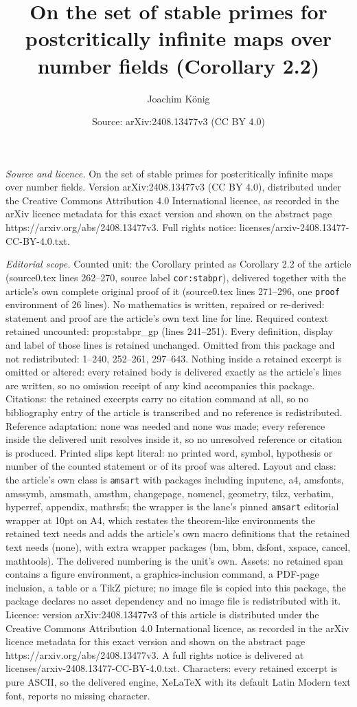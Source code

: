 \documentclass[10pt,a4paper]{amsart}
\title[On the set of stable primes for postcritically infinite maps]{On the set of stable primes for postcritically infinite maps over number fields (Corollary 2.2)}
\author{Joachim K\"onig}
\date{Source: arXiv:2408.13477v3 (CC BY 4.0)}
\begin{document}
\maketitle

\noindent\emph{Source and licence.} On the set of stable primes for postcritically infinite maps over number fields. Version arXiv:2408.13477v3 (CC BY 4.0), distributed under the Creative Commons Attribution 4.0 International licence, as recorded in the arXiv licence metadata for this exact version and shown on the abstract page https://arxiv.org/abs/2408.13477v3. Full rights notice: licenses/arxiv-2408.13477-CC-BY-4.0.txt.\par\smallskip

\noindent\textit{Editorial scope.} Counted unit: the Corollary printed as Corollary 2.2 of the article (source0.tex lines 262--270, source label \texttt{cor:stabpr}), delivered together with the article's own complete original proof of it (source0.tex lines 271--296, one \texttt{proof} environment of 26 lines). No mathematics is written, repaired or re-derived: statement and proof are the article's own text line for line. Required context retained uncounted: prop:stabpr\_gp (lines 241--251). Every definition, display and label of those lines is retained unchanged. Omitted from this package and not redistributed: 1--240, 252--261, 297--643. Nothing inside a retained excerpt is omitted or altered: every retained body is delivered exactly as the article's lines are written, so no omission receipt of any kind accompanies this package. Citations: the retained excerpts carry no citation command at all, so no bibliography entry of the article is transcribed and no reference is redistributed. Reference adaptation: none was needed and none was made; every reference inside the delivered unit resolves inside it, so no unresolved reference or citation is produced. Printed slips kept literal: no printed word, symbol, hypothesis or number of the counted statement or of its proof was altered. Layout and class: the article's own class is \texttt{amsart} with packages including inputenc, a4, amsfonts, amssymb, amsmath, amsthm, changepage, nomencl, geometry, tikz, verbatim, hyperref, appendix, mathrsfs; the wrapper is the lane's pinned \texttt{amsart} editorial wrapper at 10pt on A4, which restates the theorem-like environments the retained text needs and adds the article's own macro definitions that the retained text needs (none), with extra wrapper packages (bm, bbm, dsfont, xspace, cancel, mathtools). The delivered numbering is the unit's own. Assets: no retained span contains a figure environment, a graphics-inclusion command, a PDF-page inclusion, a table or a TikZ picture; no image file is copied into this package, the package declares no asset dependency and no image file is redistributed with it. Licence: version arXiv:2408.13477v3 of this article is distributed under the Creative Commons Attribution 4.0 International licence, as recorded in the arXiv licence metadata for this exact version and shown on the abstract page https://arxiv.org/abs/2408.13477v3. A full rights notice is delivered at licenses/arxiv-2408.13477-CC-BY-4.0.txt. Characters: every retained excerpt is pure ASCII, so the delivered engine, XeLaTeX with its default Latin Modern text font, reports no missing character.
\end{document}
